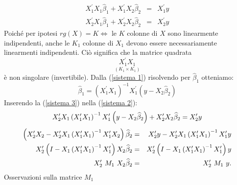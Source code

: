 \documentclass[a4paper]{report}
\theoremstyle{remark}
\begin{document}
\begin{eqnarray}
X_{1}^{\prime }X_{1}\widehat{\beta }_{1}+X_{1}^{\prime }X_{2}\widehat{\beta }%
_{2} &=&X_{1}^{\prime }y  \label{sistema 1} \\
X_{2}^{\prime }X_{1}\widehat{\beta }_{1}+X_{2}^{\prime }X_{2}\widehat{\beta }%
_{2} &=&X_{2}^{\prime }y  \label{sistema 2}
\end{eqnarray}%
Poich\'{e} per ipotesi $rg(X)=K\Leftrightarrow $ le $K$ colonne di $X$ sono
linearmente indipendenti, anche le $K_{1}$ colonne di $X_{1}$ devono essere
necessariamente linearmenti indipendenti. Ci\`{o} significa che la matrice
quadrata%
\begin{equation*}
\underset{\left( K_{1}\times K_{1}\right) }{X_{1}^{\prime }X_{1}}
\end{equation*}%
\`{e} non singolare (invertibile). Dalla (\ref{sistema 1}) risolvendo per $%
\widehat{\beta }_{1}$ otteniamo:%
\begin{equation}
\widehat{\beta }_{1}=\left( X_{1}^{\prime }X_{1}\right) ^{-1}X_{1}^{\prime
}\left( y-X_{2}\widehat{\beta }_{2}\right)  \label{sistema 3}
\end{equation}%
Inserendo la (\ref{sistema 3}) nella (\ref{sistema 2}):%
\begin{equation*}
X_{2}^{\prime }X_{1}\left( X_{1}^{\prime }X_{1}\right) ^{-1}X_{1}^{\prime
}\left( y-X_{2}\widehat{\beta }_{2}\right) +X_{2}^{\prime }X_{2}\widehat{%
\beta }_{2}=X_{2}^{\prime }y
\end{equation*}%
\begin{eqnarray}
\left( X_{2}^{\prime }X_{2}-X_{2}^{\prime }X_{1}\left( X_{1}^{\prime
}X_{1}\right) ^{-1}X_{1}^{\prime }X_{2}\right) \widehat{\beta }_{2}
&=&X_{2}^{\prime }y-X_{2}^{\prime }X_{1}\left( X_{1}^{\prime }X_{1}\right)
^{-1}X_{1}^{\prime }y  \notag \\
X_{2}^{\prime }\left( I-X_{1}\left( X_{1}^{\prime }X_{1}\right)
^{-1}X_{1}^{\prime }\right) X_{2}\widehat{\beta }_{2} &=&X_{2}^{\prime
}\left( I-X_{1}\left( X_{1}^{\prime }X_{1}\right) ^{-1}X_{1}^{\prime
}\right) y  \notag \\
X_{2}^{\prime }\ M_{1}\ X_{2}\widehat{\beta }_{2} &=&X_{2}^{\prime }\ M_{1}\
y.  \label{sistema 3bis}
\end{eqnarray}%
Osservazioni sulla matrice $M_{1}$
\end{document}
